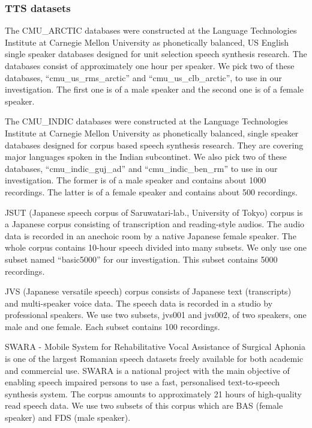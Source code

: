 \documentclass[12pt]{article}
\begin{document}
\subsubsection{TTS datasets}
The CMU\_ARCTIC databases were constructed at the Language Technologies Institute at Carnegie Mellon University as phonetically balanced, US English single speaker databases designed for unit selection speech synthesis research. The databases consist of approximately one hour per speaker. We pick two of these databases, “cmu\_us\_rms\_arctic” and “cmu\_us\_clb\_arctic”, to use in our investigation. The first one is of a male speaker and the second one is of a female speaker.

The CMU\_INDIC databases were constructed at the Language Technologies Institute at Carnegie Mellon University as phonetically balanced, single speaker databases designed for corpus based speech synthesis research. They are covering major languages spoken in the Indian subcontinet. We also pick two of these databases, “cmu\_indic\_guj\_ad” and “cmu\_indic\_ben\_rm” to use in our investigation. The former is of a male speaker and contains about 1000 recordings. The latter is of a female speaker and contains about 500 recordings.

JSUT (Japanese speech corpus of Saruwatari-lab., University of Tokyo) corpus is a Japanese corpus consisting of transcription and reading-style audios. The audio data is recorded in an anechoic room by a native Japanese female speaker. The whole corpus contains 10-hour speech divided into many subsets. We only use one subset named “basic5000” for our investigation. This subset contains 5000 recordings.

JVS (Japanese versatile speech) corpus consists of Japanese text (transcripts) and multi-speaker voice data. The speech data is recorded in a studio by professional speakers. We use two subsets, jvs001 and jvs002, of two speakers, one male and one female. Each subset contains 100 recordings.

SWARA - Mobile System for Rehabilitative Vocal Assistance of Surgical Aphonia is one of the largest Romanian speech datasets freely available for both academic and commercial use. SWARA is a national project with the main objective of enabling speech impaired persons to use a fast, personalised text-to-speech synthesis system. The corpus amounts to approximately 21 hours of high-quality read speech data. We use two subsets of this corpus which are BAS (female speaker) and FDS (male speaker).
\end{document}
